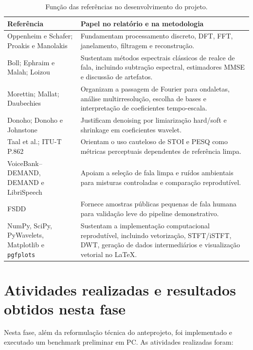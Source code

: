 \begin{table}[!htbp]
\centering
\caption{Função das referências no desenvolvimento do projeto.}
\label{tab:referencias-papel}
\begin{tabularx}{\textwidth}{>{\raggedright\arraybackslash}p{4.0cm}X}
\toprule
\textbf{Referência} & \textbf{Papel no relatório e na metodologia} \\
\midrule
Oppenheim e Schafer; Proakis e Manolakis & Fundamentam processamento discreto, DFT, FFT, janelamento, filtragem e reconstrução. \\
\addlinespace
Boll; Ephraim e Malah; Loizou & Sustentam métodos espectrais clássicos de realce de fala, incluindo subtração espectral, estimadores MMSE e discussão de artefatos. \\
\addlinespace
Morettin; Mallat; Daubechies & Organizam a passagem de Fourier para ondaletas, análise multirresolução, escolha de bases e interpretação de coeficientes tempo-escala. \\
\addlinespace
Donoho; Donoho e Johnstone & Justificam denoising por limiarização hard/soft e shrinkage em coeficientes wavelet. \\
\addlinespace
Taal et al.; ITU-T P.862 & Orientam o uso cauteloso de STOI e PESQ como métricas perceptuais dependentes de referência limpa. \\
\addlinespace
VoiceBank--DEMAND, DEMAND e LibriSpeech & Apoiam a seleção de fala limpa e ruídos ambientais para misturas controladas e comparação reprodutível. \\
\addlinespace
FSDD & Fornece amostras públicas pequenas de fala humana para validação leve do pipeline demonstrativo. \\
\addlinespace
NumPy, SciPy, PyWavelets, Matplotlib e \texttt{pgfplots} & Sustentam a implementação computacional reprodutível, incluindo vetorização, STFT/iSTFT, DWT, geração de dados intermediários e visualização vetorial no LaTeX. \\
\bottomrule
\end{tabularx}
\end{table}
\FloatBarrier

\section{Atividades realizadas e resultados obtidos nesta fase}

Nesta fase, além da reformulação técnica do anteprojeto, foi implementado e executado um benchmark preliminar em PC. As atividades realizadas foram:

